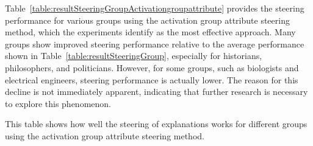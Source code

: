 Table~\ref{table:resultSteeringGroupActivationgroupattribute} provides the steering performance for various groups using the activation group attribute steering method, which the experiments identify as the most effective approach. Many groups show improved steering performance relative to the average performance shown in Table~\ref{table:resultSteeringGroup}, especially for historians, philosophers, and politicians. However, for some groups, such as biologists and electrical engineers, steering performance is actually lower. The reason for this decline is not immediately apparent, indicating that further research is necessary to explore this phenomenon.

\begin{table}[ht]
  \caption[]{This table shows how well the steering of explanations works for different groups using the activation group attribute steering method.}%
  \label{table:resultSteeringGroupActivationgroupattribute}
  \centering
  \resultSteeringGroupActivationgroupattribute{}%
\end{table}
